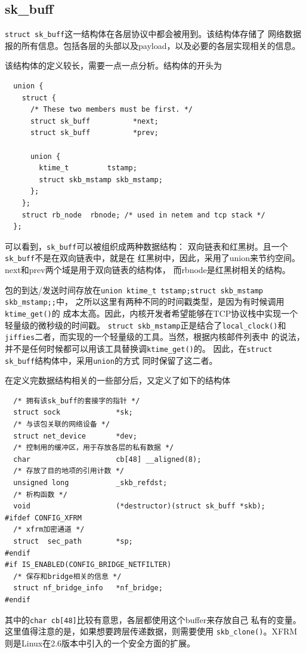 \documentclass[11pt, a4paper,oneside]{book}
\theoremstyle{ocrenumbox}
\theoremstyle{purplenumbox}
\theoremstyle{blackbox}
\begin{document}
	\subsection{sk\_buff}
\label{sec:sk_buff}

\texttt{struct sk_buff}这一结构体在各层协议中都会被用到。该结构体存储了
网络数据报的所有信息。包括各层的头部以及payload，以及必要的各层实现相关的信息。

该结构体的定义较长，需要一点一点分析。结构体的开头为
\begin{verbatim}
  union {
    struct {
      /* These two members must be first. */
      struct sk_buff          *next;
      struct sk_buff          *prev;

      union {
        ktime_t         tstamp;
        struct skb_mstamp skb_mstamp;
      };
    };
    struct rb_node  rbnode; /* used in netem and tcp stack */
  };
\end{verbatim}
可以看到，\texttt{sk_buff}可以被组织成两种数据结构：
双向链表和红黑树。且一个\texttt{sk_buff}不是在双向链表中，就是在
红黑树中，因此，采用了union来节约空间。next和prev两个域是用于双向链表的结构体，
而rbnode是红黑树相关的结构。

包的到达/发送时间存放在\texttt{union {ktime_t tstamp;struct skb_mstamp skb_mstamp;};}中，
之所以这里有两种不同的时间戳类型，是因为有时候调用\texttt{ktime_get()}的
成本太高。因此，内核开发者希望能够在TCP协议栈中实现一个轻量级的微秒级的时间戳。
\texttt{struct skb_mstamp}正是结合了\texttt{local_clock()}和
\texttt{jiffies}二者，而实现的一个轻量级的工具。当然，根据内核邮件列表中
的说法，并不是任何时候都可以用该工具替换调\texttt{ktime_get()}的。
因此，在\texttt{struct sk_buff}结构体中，采用\texttt{union}的方式
同时保留了这二者。

在定义完数据结构相关的一些部分后，又定义了如下的结构体
\begin{verbatim}
  /* 拥有该sk_buff的套接字的指针 */
  struct sock             *sk;
  /* 与该包关联的网络设备 */
  struct net_device       *dev;
  /* 控制用的缓冲区，用于存放各层的私有数据 */
  char                    cb[48] __aligned(8);
  /* 存放了目的地项的引用计数 */
  unsigned long           _skb_refdst;
  /* 析构函数 */
  void                    (*destructor)(struct sk_buff *skb);
#ifdef CONFIG_XFRM
  /* xfrm加密通道 */
  struct  sec_path        *sp;
#endif
#if IS_ENABLED(CONFIG_BRIDGE_NETFILTER)
  /* 保存和bridge相关的信息 */
  struct nf_bridge_info   *nf_bridge;
#endif
\end{verbatim}
其中的\texttt{char cb[48]}比较有意思，各层都使用这个buffer来存放自己
私有的变量。这里值得注意的是，如果想要跨层传递数据，则需要使用
\texttt{skb_clone()}。XFRM则是Linux在2.6版本中引入的一个安全方面的扩展。
\end{document}
